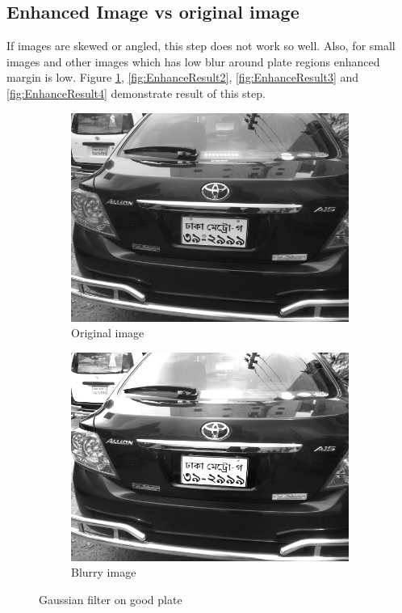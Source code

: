 \subsection{Enhanced Image vs original image}
If images are skewed or angled, this step does not work so well. Also, for small images and other images which has low blur around plate regions enhanced margin is low. Figure \ref{fig:EnhanceResult1}, \ref{fig:EnhanceResult2}, \ref{fig:EnhanceResult3} and \ref{fig:EnhanceResult4} demonstrate result of this step.

\begin{figure}
\begin{subfigure}{0.5\textwidth}
    \centering
    \includegraphics[width=0.9\linewidth]{./img/experiment/stage.2/angle3}
    \caption{Original image}
\end{subfigure}
\begin{subfigure}{0.5\textwidth}
    \centering
    \includegraphics[width=0.9\linewidth]{./img/experiment/stage.5/angle3}
    \caption{Blurry image}
\end{subfigure}
\caption{Gaussian filter on good plate}
\label{fig:EnhanceResult1}
\end{figure}

